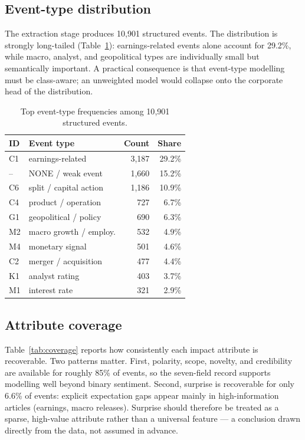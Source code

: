 \documentclass[sigconf,nonacm]{acmart}
\begin{document}
\subsection{Event-type distribution}
The extraction stage produces 10{,}901 structured events. The
distribution is strongly long-tailed (Table~\ref{tab:freq}):
earnings-related events alone account for 29.2\%, while macro, analyst,
and geopolitical types are individually small but semantically
important. A practical consequence is that event-type modelling must be
class-aware; an unweighted model would collapse onto the corporate head
of the distribution.

\begin{table}[t]
\caption{Top event-type frequencies among 10{,}901 structured events.}
\label{tab:freq}
\begin{tabular}{llrr}
\toprule
ID & Event type & Count & Share \\
\midrule
C1 & earnings-related        & 3{,}187 & 29.2\% \\
-- & NONE / weak event       & 1{,}660 & 15.2\% \\
C6 & split / capital action  & 1{,}186 & 10.9\% \\
C4 & product / operation     & \phantom{0,}727 & \phantom{0}6.7\% \\
G1 & geopolitical / policy   & \phantom{0,}690 & \phantom{0}6.3\% \\
M2 & macro growth / employ.  & \phantom{0,}532 & \phantom{0}4.9\% \\
M4 & monetary signal         & \phantom{0,}501 & \phantom{0}4.6\% \\
C2 & merger / acquisition    & \phantom{0,}477 & \phantom{0}4.4\% \\
K1 & analyst rating          & \phantom{0,}403 & \phantom{0}3.7\% \\
M1 & interest rate           & \phantom{0,}321 & \phantom{0}2.9\% \\
\bottomrule
\end{tabular}
\end{table}

\subsection{Attribute coverage}
Table~\ref{tab:coverage} reports how consistently each impact attribute
is recoverable. Two patterns matter. First, polarity, scope, novelty, and
credibility are available for roughly 85\% of events, so the seven-field
record supports modelling well beyond binary sentiment. Second, surprise
is recoverable for only 6.6\% of events: explicit expectation gaps appear
mainly in high-information articles (earnings, macro releases). Surprise
should therefore be treated as a sparse, high-value attribute rather than
a universal feature --- a conclusion drawn directly from the data, not
assumed in advance.
\end{document}
